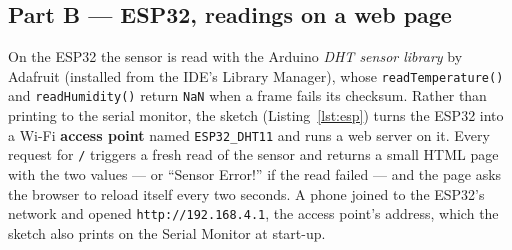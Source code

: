 \documentclass[10pt,a4paper]{article}
\begin{document}
\subsection{Part B --- ESP32, readings on a web page}

On the ESP32 the sensor is read with the Arduino \emph{DHT sensor library} by Adafruit
(installed from the IDE's Library Manager), whose \texttt{readTemperature()} and
\texttt{readHumidity()} return \texttt{NaN} when a frame fails its checksum. Rather
than printing to the serial monitor, the sketch (Listing~\ref{lst:esp}) turns the ESP32
into a Wi-Fi \textbf{access point} named \texttt{ESP32\_DHT11} and runs a web server on
it. Every request for \texttt{/} triggers a fresh read of the sensor and returns a
small HTML page with the two values --- or ``Sensor Error!'' if the read failed --- and
the page asks the browser to reload itself every two seconds. A phone joined to the
ESP32's network and opened \texttt{http://192.168.4.1}, the access point's address,
which the sketch also prints on the Serial Monitor at start-up.
\end{document}

